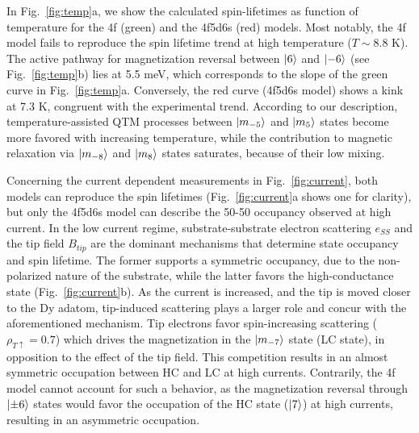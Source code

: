 \documentclass[
reprint,amsmath,amssymb,aps]{revtex4-2}
\begin{document}

In Fig.~\ref{fig:temp}a, we show the calculated spin-lifetimes as function of temperature for the 4f (green) and the 4f5d6s (red) models. Most notably, the 4f model fails to reproduce the spin lifetime trend at high temperature ($T\sim 8.8$ K). The active pathway for magnetization reversal between $\ket{6}$ and $\ket{-6}$ (see Fig.~\ref{fig:temp}b) lies at 5.5 meV, which corresponds to the slope of the green curve in Fig.~\ref{fig:temp}a. Conversely, the red curve (4f5d6s model) shows a kink at 7.3 K, congruent with the experimental trend. According to our description, temperature-assisted QTM processes between $\ket{m_{-5}}$ and $\ket{m_{5}}$ states become more favored with increasing temperature, while the contribution to magnetic relaxation via $\ket{m_{-8}}$ and $\ket{m_{8}}$ states saturates, because of their low mixing.

Concerning the current dependent measurements in Fig.~\ref{fig:current}, both models can reproduce the spin lifetimes (Fig.~\ref{fig:current}a shows one for clarity), but only the 4f5d6s model can describe the 50-50 occupancy observed at high current. In the low current regime, substrate-substrate electron scattering $e_{SS}$ and the tip field $B_{tip}$ are the dominant mechanisms that determine state occupancy and spin lifetime. The former supports a symmetric occupancy, due to the non-polarized nature of the substrate, while the latter favors the high-conductance state (Fig.~\ref{fig:current}b). As the current is increased, and the tip is moved closer to the Dy adatom, tip-induced scattering plays a larger role and concur with the aforementioned mechanism. Tip electrons favor spin-increasing scattering ($\rho_{T \uparrow} = 0.7$) which drives the magnetization in the $\ket{m_{-7}}$ state (LC state), in opposition to the effect of the tip field. This competition results in an almost symmetric occupation between HC and LC at high currents. Contrarily, the 4f model cannot account for such a behavior, as the magnetization reversal through $\ket{\pm 6}$ states would favor the occupation of the HC state ($\ket{7}$) at high currents, resulting in an asymmetric occupation.
\end{document}
